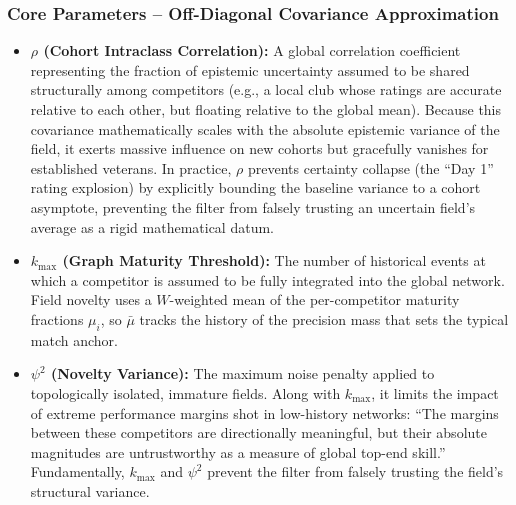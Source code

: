 \documentclass[12pt]{article}
\begin{document}
	\subsubsection*{Core Parameters -- Off-Diagonal Covariance Approximation}
	\begin{itemize}
		\item \textbf{$\rho$ (Cohort Intraclass Correlation):} A global correlation coefficient representing the fraction of epistemic uncertainty assumed to be shared structurally among competitors (e.g., a local club whose ratings are accurate relative to each other, but floating relative to the global mean). Because this covariance mathematically scales with the absolute epistemic variance of the field, it exerts massive influence on new cohorts but gracefully vanishes for established veterans. In practice, $\rho$ prevents certainty collapse (the ``Day 1'' rating explosion) by explicitly bounding the baseline variance to a cohort asymptote, preventing the filter from falsely trusting an uncertain field's average as a rigid mathematical datum.
		\item \textbf{$k_{\mathrm{max}}$ (Graph Maturity Threshold):} The number of historical events at which a competitor is assumed to be fully integrated into the global network. Field novelty uses a $W$-weighted mean of the per-competitor maturity fractions $\mu_i$, so $\bar{\mu}$ tracks the history of the precision mass that sets the typical match anchor.
		\item \textbf{$\psi^2$ (Novelty Variance):} The maximum noise penalty applied to topologically isolated, immature fields. Along with $k_{\mathrm{max}}$, it limits the impact of extreme performance margins shot in low-history networks: ``The margins between these competitors are directionally meaningful, but their absolute magnitudes are untrustworthy as a measure of global top-end skill.'' Fundamentally, $k_{\mathrm{max}}$ and $\psi^2$ prevent the filter from falsely trusting the field's structural variance.
	\end{itemize}
\end{document}

